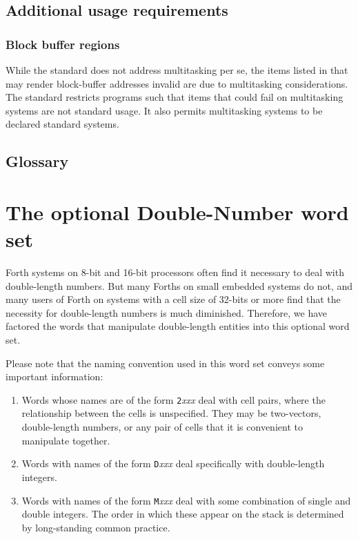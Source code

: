 \subsection{Additional usage requirements}
\setcounter{subsubsection}{1}
\subsubsection{Block buffer regions}
\label{rat:block:buffers}

	While the standard does not address multitasking per se, the
	items listed in  that may render block-buffer
	addresses invalid are due to multitasking considerations.
	The standard restricts programs such that items that could fail on
	multitasking systems are not standard usage.  It also permits
	multitasking systems to be declared standard systems.

\setcounter{subsection}{5}
\subsection{Glossary} %



\section{The optional Double-Number word set} %
\label{rat:double}

Forth systems on 8-bit and 16-bit processors often find it necessary
to deal with double-length numbers. But many Forths on small embedded
systems do not, and many users of Forth on systems with a cell size of
32-bits or more find that the necessity for double-length numbers is
much diminished. Therefore, we have factored the words that manipulate
double-length entities into this optional word set.

Please note that the naming convention used in this word set conveys
some important information:

\begin{enumerate}
\item[1.]
	Words whose names are of the form \texttt{2}\emph{xxx} deal
	with cell pairs, where the relationship between the cells is
	unspecified. They may be two-vectors, double-length numbers, or
	any pair of cells that it is convenient to manipulate together.

\item[2.]
	Words with names of the form \texttt{D}\emph{xxx} deal
	specifically with double-length integers.

\item[3.]
	Words with names of the form \texttt{M}\emph{xxx} deal with
	some combination of single and double integers. The order in
	which these appear on the stack is determined by long-standing
	common practice.
\end{enumerate}


